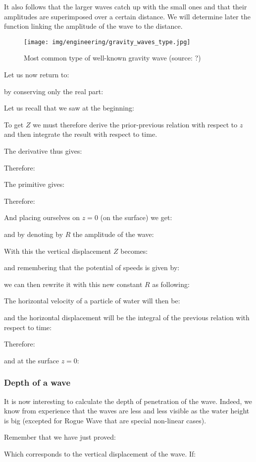 	It also follows that the larger waves catch up with the small ones and that their amplitudes are superimposed over a certain distance. We will determine later the function linking the amplitude of the wave to the distance.
	\begin{figure}[H]
		\centering
		\texttt{[image: img/engineering/gravity\_waves\_type.jpg]}	
		\caption[Most common type of well-known gravity wave]{Most common type of well-known gravity wave (source: ?)}
	\end{figure}
	Let us now return to:
	
	by conserving only the real part:
	
	Let us recall that we saw at the beginning:
	
	To get $Z$ we must therefore derive the prior-previous relation with respect to $z$ and then integrate the result with respect to time.

	The derivative thus gives:
	
	Therefore:
	
	The primitive gives:
	
	Therefore:
	
	And placing ourselves on $z=0$ (on the surface) we get:
	
	and by denoting by $R$ the amplitude of the wave:
	
	With this the vertical displacement $Z$ becomes:
	
	and remembering that the potential of speeds is given by:
	
	we can then rewrite it with this new constant $R$ as following:
	
	The horizontal velocity of a particle of water will then be:
	
	and the horizontal displacement will be the integral of the previous relation with respect to time:
	
	Therefore:
	
	and at the surface $z=0$:
	
	
	\subsubsection{Depth of a wave}
	It is now interesting to calculate the depth of penetration of the wave. Indeed, we know from experience that the waves are less and less visible as the water height is big (excepted for Rogue Wave that are special non-linear cases).

	Remember that we have just proved:
	
	Which corresponds to the vertical displacement of the wave. If:
	
